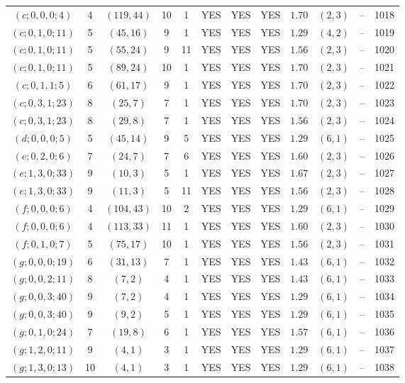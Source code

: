 \begin{longtable}{|c|c|c|c|c|c|c|c|c|c|c|c|}
$(c;0,0,0;4)$ & 4 & $(119,44)$ & 10 & 1 & YES & YES & YES & $1.70$ & $(2,3)$ & -- & 1018\\
$(c;0,1,0;11)$ & 5 & $(45,16)$ & 9 & 1 & YES & YES & YES & $1.29$ & $(4,2)$ & -- & 1019\\
$(c;0,1,0;11)$ & 5 & $(55,24)$ & 9 & 11 & YES & YES & YES & $1.56$ & $(2,3)$ & -- & 1020\\
$(c;0,1,0;11)$ & 5 & $(89,24)$ & 10 & 1 & YES & YES & YES & $1.70$ & $(2,3)$ & -- & 1021\\
$(c;0,1,1;5)$ & 6 & $(61,17)$ & 9 & 1 & YES & YES & YES & $1.70$ & $(2,3)$ & -- & 1022\\
$(c;0,3,1;23)$ & 8 & $(25,7)$ & 7 & 1 & YES & YES & YES & $1.70$ & $(2,3)$ & -- & 1023\\
$(c;0,3,1;23)$ & 8 & $(29,8)$ & 7 & 1 & YES & YES & YES & $1.56$ & $(2,3)$ & -- & 1024\\
$(d;0,0,0;5)$ & 5 & $(45,14)$ & 9 & 5 & YES & YES & YES & $1.29$ & $(6,1)$ & -- & 1025\\
$(e;0,2,0;6)$ & 7 & $(24,7)$ & 7 & 6 & YES & YES & YES & $1.60$ & $(2,3)$ & -- & 1026\\
$(e;1,3,0;33)$ & 9 & $(10,3)$ & 5 & 1 & YES & YES & YES & $1.67$ & $(2,3)$ & -- & 1027\\
$(e;1,3,0;33)$ & 9 & $(11,3)$ & 5 & 11 & YES & YES & YES & $1.56$ & $(2,3)$ & -- & 1028\\
$(f;0,0,0;6)$ & 4 & $(104,43)$ & 10 & 2 & YES & YES & YES & $1.29$ & $(6,1)$ & -- & 1029\\
$(f;0,0,0;6)$ & 4 & $(113,33)$ & 11 & 1 & YES & YES & YES & $1.60$ & $(2,3)$ & -- & 1030\\
$(f;0,1,0;7)$ & 5 & $(75,17)$ & 10 & 1 & YES & YES & YES & $1.56$ & $(2,3)$ & -- & 1031\\
$(g;0,0,0;19)$ & 6 & $(31,13)$ & 7 & 1 & YES & YES & YES & $1.43$ & $(6,1)$ & -- & 1032\\
$(g;0,0,2;11)$ & 8 & $(7,2)$ & 4 & 1 & YES & YES & YES & $1.43$ & $(6,1)$ & -- & 1033\\
$(g;0,0,3;40)$ & 9 & $(7,2)$ & 4 & 1 & YES & YES & YES & $1.29$ & $(6,1)$ & -- & 1034\\
$(g;0,0,3;40)$ & 9 & $(9,2)$ & 5 & 1 & YES & YES & YES & $1.29$ & $(6,1)$ & -- & 1035\\
$(g;0,1,0;24)$ & 7 & $(19,8)$ & 6 & 1 & YES & YES & YES & $1.57$ & $(6,1)$ & -- & 1036\\
$(g;1,2,0;11)$ & 9 & $(4,1)$ & 3 & 1 & YES & YES & YES & $1.29$ & $(6,1)$ & -- & 1037\\
$(g;1,3,0;13)$ & 10 & $(4,1)$ & 3 & 1 & YES & YES & YES & $1.29$ & $(6,1)$ & -- & 1038\\

\end{longtable}

